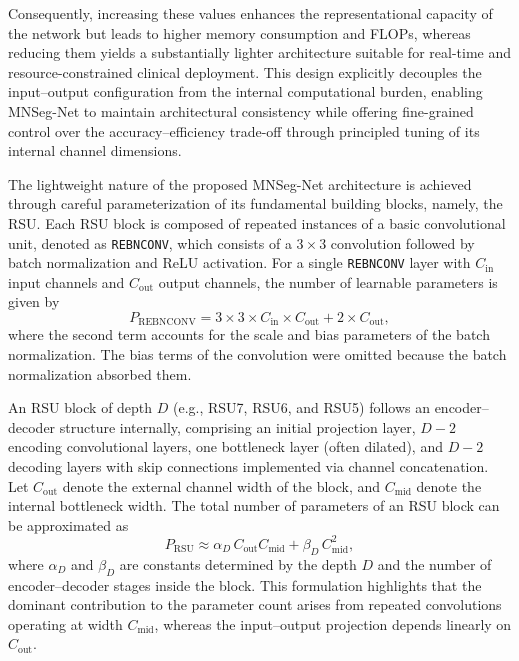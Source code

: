 \documentclass[12pt,letterpaper]{article}
\begin{document}
Consequently, increasing these values enhances the representational capacity of the network but leads to higher memory consumption and FLOPs, whereas reducing them yields a substantially lighter architecture suitable for real-time and resource-constrained clinical deployment. This design explicitly decouples the input--output configuration from the internal computational burden, enabling MNSeg-Net to maintain architectural consistency while offering fine-grained control over the accuracy--efficiency trade-off through principled tuning of its internal channel dimensions.






















The lightweight nature of the proposed MNSeg-Net architecture is achieved through careful parameterization of its fundamental building blocks, namely, the RSU. Each RSU block is composed of repeated instances of a basic convolutional unit, denoted as \texttt{REBNCONV}, which consists of a $3 \times 3$ convolution followed by batch normalization and ReLU activation. For a single \texttt{REBNCONV} layer with $C_{\text{in}}$ input channels and $C_{\text{out}}$ output channels, the number of learnable parameters is given by
\begin{equation}
P_{\text{REBNCONV}} = 3 \times 3 \times C_{\text{in}} \times C_{\text{out}} + 2 \times C_{\text{out}},
\end{equation}
where the second term accounts for the scale and bias parameters of the batch normalization. The bias terms of the convolution were omitted because the batch normalization absorbed them.

An RSU block of depth $D$ (e.g., RSU7, RSU6, and RSU5) follows an encoder--decoder structure internally, comprising an initial projection layer, $D-2$ encoding convolutional layers, one bottleneck layer (often dilated), and $D-2$ decoding layers with skip connections implemented via channel concatenation. Let $C_{\text{out}}$ denote the external channel width of the block, and $C_{\text{mid}}$ denote the internal bottleneck width. The total number of parameters of an RSU block can be approximated as
\begin{equation}
P_{\text{RSU}} \approx \alpha_D \, C_{\text{out}} C_{\text{mid}} + \beta_D \, C_{\text{mid}}^2,
\end{equation}
where $\alpha_D$ and $\beta_D$ are constants determined by the depth $D$ and the number of encoder--decoder stages inside the block. This formulation highlights that the dominant contribution to the parameter count arises from repeated convolutions operating at width $C_{\text{mid}}$, whereas the input--output projection depends linearly on $C_{\text{out}}$.
\end{document}

